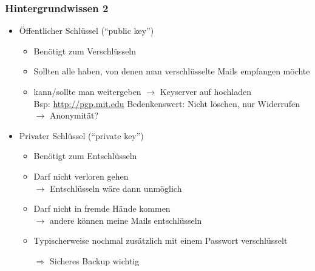 \documentclass{beamer}
\begin{document}

\begin{frame}[label=bg3]
  \frametitle{Hintergrundwissen 2}
  
    \begin{itemize}
   \item Öffentlicher Schlüssel ("`public key"')
   \begin{itemize}
    \item Benötigt zum Verschlüsseln
    \item Sollten alle haben, von denen man verschlüsselte Mails empfangen möchte
    \item kann/sollte man weitergeben $\rightarrow$ Keyserver auf hochladen\\
    {\tiny Bsp: \url{http://pgp.mit.edu} \quad Bedenkenswert: Nicht löschen, nur Widerrufen $\rightarrow$ Anonymität?}
    
   \end{itemize}
   \pause
   \item Privater Schlüssel ("`private key"')
   \begin{itemize}
    \item Benötigt zum Entschlüsseln
    \item Darf nicht verloren gehen\\$\rightarrow$ Entschlüsseln wäre dann unmöglich\\[1mm]
    \item Darf nicht in fremde Hände kommen\\ $\rightarrow$ andere können meine Mails entschlüsseln\\[1mm]
    \item Typischerweise nochmal zusätzlich mit einem Passwort verschlüsselt\\[2mm]
    \pause
    \item[$\Rightarrow$] Sicheres Backup wichtig
   \end{itemize}


  \end{itemize}
  
\end{frame}
\end{document}

